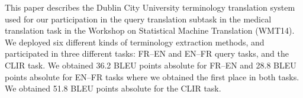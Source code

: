 This paper describes the Dublin City University terminology translation system used for our participation in the query translation subtask in the medical translation task in the Workshop on Statistical Machine Translation (WMT14).  We deployed six different kinds of terminology extraction methods, and participated in three different tasks: FR--EN and EN--FR query tasks, and the CLIR task.              We obtained 36.2 BLEU points absolute for FR--EN and 28.8 BLEU points absolute for EN--FR tasks where we obtained the first place in both tasks.  We obtained 51.8 BLEU points absolute for the CLIR task.
